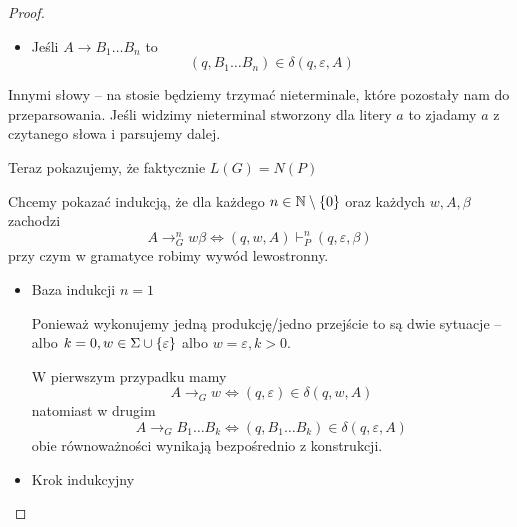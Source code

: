 \begin{proof}
\begin{description}
\begin{itemize}
			      \item Jeśli \( A \rightarrow B_1\dots B_n \) to
			            \[
				            (q, B_1\dots B_n) \in \delta(q, \varepsilon, A)
			            \]
		      \end{itemize}

		      Innymi słowy -- na stosie będziemy trzymać nieterminale, które pozostały nam do przeparsowania.
		      Jeśli widzimy nieterminal stworzony dla litery \( a \) to zjadamy \( a \) z czytanego słowa i parsujemy dalej.

		      Teraz pokazujemy, że faktycznie \( L(G) = N(P) \)

		      Chcemy pokazać indukcją, że dla każdego \( n \in \natural \setminus \set{0} \) oraz każdych \( w, A, \beta \) zachodzi
		      \[
			      A \rightarrow_G^n w\beta \iff (q, w, A) \vdash_P^n (q, \varepsilon, \beta)
		      \]
		      przy czym w gramatyce robimy wywód lewostronny.

		      \begin{itemize}
			      \item Baza indukcji \( n = 1 \)

			            Ponieważ wykonujemy jedną produkcję/jedno przejście to są dwie sytuacje -- albo \( k = 0, w \in \Sigma \cup \set{\varepsilon} \) albo \( w = \varepsilon, k > 0 \).

			            W pierwszym przypadku mamy
			            \[
				            A \rightarrow_G w \iff (q, \varepsilon) \in \delta(q, w, A)
			            \]
			            natomiast w drugim
			            \[
				            A \rightarrow_G B_1 \dots B_k \iff (q, B_1\dots B_k) \in \delta(q, \varepsilon, A)
			            \]
			            obie równoważności wynikają bezpośrednio z konstrukcji.

			      \item Krok indukcyjny



		      \end{itemize}


	\end{description}
\end{proof}